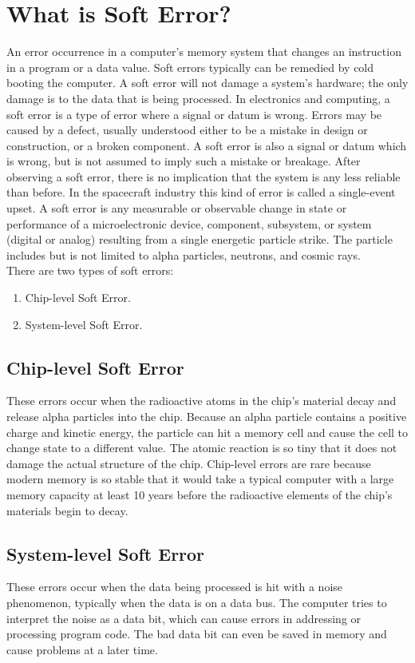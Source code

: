 \documentclass[12pt,a4paper]{report}
\begin{document}
 \section{What is Soft Error?}
 An error occurrence in a computer's memory system that changes an instruction in a program or a data value. Soft errors typically can be remedied by cold booting the computer. A soft error will not damage a system's hardware; the only damage is to the data that is being processed. In electronics and computing, a soft error is a type of error where a signal or datum is wrong. Errors may be caused by a defect, usually understood either to be a mistake in design or construction, or a broken component. A soft error is also a signal or datum which is wrong, but is not assumed to imply such a mistake or breakage. After observing a soft error, there is no implication that the system is any less reliable than before. In the spacecraft industry this kind of error is called a single-event upset. A soft error is any measurable or observable change in state or performance of a microelectronic device, component, subsystem, or system (digital or analog) resulting from a single energetic particle strike. The particle includes but is not limited to alpha particles, neutrons, and cosmic rays.\\
 
 There are two types of soft errors:
 \begin{enumerate}
 \item Chip-level Soft Error.
 \item System-level Soft Error.
 \end{enumerate}
 \subsection{Chip-level Soft Error}
 These errors occur when the radioactive atoms in the chip's material decay and release alpha particles into the chip. Because an alpha particle contains a positive charge and kinetic energy, the particle can hit a memory cell and cause the cell to change state to a different value. The atomic reaction is so tiny that it does not damage the actual structure of the chip. Chip-level errors are rare because modern memory is so stable that it would take a typical computer with a large memory capacity at least 10 years before the radioactive elements of the chip's materials begin to decay.
 
 \subsection{System-level Soft Error}
 These errors occur when the data being processed is hit with a noise phenomenon, typically when the data is on a data bus. The computer tries to interpret the noise as a data bit, which can cause errors in addressing or processing program code. The bad data bit can even be saved in memory and cause problems at a later time.
 
\end{document}

